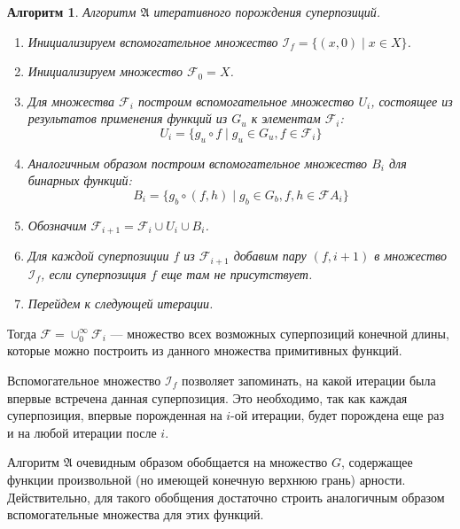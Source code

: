 \documentclass[12pt,a4paper]{amsart}
\newtheorem{algo}{Алгоритм}
\begin{document}
\begin{algo}
  Алгоритм $\mathfrak{A}$ итеративного порождения суперпозиций.
  \begin{enumerate}
	\item Инициализируем вспомогательное множество $\mathcal{I}_f = \{ (x, 0) \mid x \in X \}$.
	\item Инициализируем множество $\mathcal{F}_0 = X$.
	\item Для множества $\mathcal{F}_i$ построим вспомогательное множество $U_i$,
	  состоящее из результатов применения функций из $G_u$ к элементам $\mathcal{F}_i$:
	  \[
	  U_i = \{ g_u \circ f \mid g_u \in G_u, f \in \mathcal{F}_i \}
	  \]
	\item Аналогичным образом построим вспомогательное множество $B_i$ для
	  бинарных функций:
	  \[
	  B_i = \{ g_b \circ (f, h) \mid g_b \in G_b, f, h \in \mathcal{F}A_i \}
	  \]
	\item Обозначим $\mathcal{F}_{i+1} = \mathcal{F}_i \cup U_i \cup B_i$.
	\item Для каждой суперпозиции $f$ из $\mathcal{F}_{i+1}$ добавим пару
	  $(f, i+1)$ в множество $\mathcal{I}_f$, если суперпозиция $f$ еще там
	  не присутствует.
	\item Перейдем к следующей итерации. 
  \end{enumerate}
\end{algo}

Тогда $\mathcal{F} = \cup_0^\infty \mathcal{F}_i$ --- множество всех
возможных суперпозиций конечной длины, которые можно построить из
данного множества примитивных функций.

Вспомогательное множество $\mathcal{I}_f$ позволяет запоминать, на какой
итерации была впервые встречена данная суперпозиция. Это необходимо, так
как каждая суперпозиция, впервые порожденная на $i$-ой итерации, будет
порождена еще раз и на любой итерации после $i$.

Алгоритм $\mathfrak{A}$ очевидным образом обобщается на множество $G$,
содержащее функции произвольной (но имеющей конечную верхнюю грань)
арности. Действительно, для такого обобщения достаточно строить аналогичным
образом вспомогательные множества для этих функций.
\end{document}
